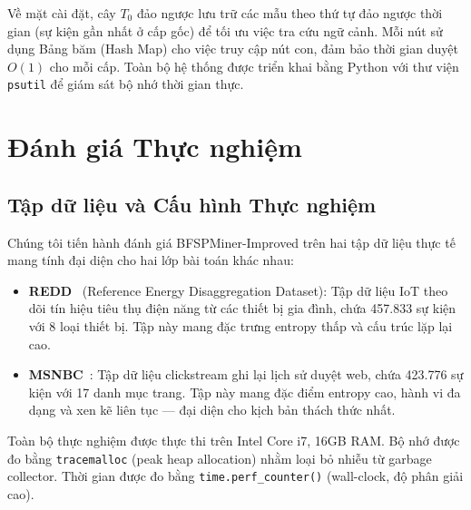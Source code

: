 \documentclass{article}
\begin{document}
Về mặt cài đặt, cây $T_0$ đảo ngược lưu trữ các mẫu theo thứ tự đảo ngược thời gian (sự kiện gần nhất ở cấp gốc) để tối ưu việc tra cứu ngữ cảnh. Mỗi nút sử dụng Bảng băm (Hash Map) cho việc truy cập nút con, đảm bảo thời gian duyệt $O(1)$ cho mỗi cấp. Toàn bộ hệ thống được triển khai bằng Python với thư viện \texttt{psutil} để giám sát bộ nhớ thời gian thực.

\section{Đánh giá Thực nghiệm}
\label{sec:experiments}

\subsection{Tập dữ liệu và Cấu hình Thực nghiệm}
Chúng tôi tiến hành đánh giá BFSPMiner-Improved trên hai tập dữ liệu thực tế mang tính đại diện cho hai lớp bài toán khác nhau:
\begin{itemize}
    \item \textbf{REDD}~\cite{kolter2011} (Reference Energy Disaggregation Dataset): Tập dữ liệu IoT theo dõi tín hiệu tiêu thụ điện năng từ các thiết bị gia đình, chứa 457.833 sự kiện với 8 loại thiết bị. Tập này mang đặc trưng entropy thấp và cấu trúc lặp lại cao.
    \item \textbf{MSNBC}~\cite{msnbc2000}: Tập dữ liệu clickstream ghi lại lịch sử duyệt web, chứa 423.776 sự kiện với 17 danh mục trang. Tập này mang đặc điểm entropy cao, hành vi đa dạng và xen kẽ liên tục --- đại diện cho kịch bản thách thức nhất.
\end{itemize}
Toàn bộ thực nghiệm được thực thi trên Intel Core i7, 16GB RAM. Bộ nhớ được đo bằng \texttt{tracemalloc} (peak heap allocation) nhằm loại bỏ nhiễu từ garbage collector. Thời gian được đo bằng \texttt{time.perf\_counter()} (wall-clock, độ phân giải cao).
\end{document}
